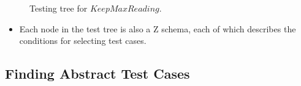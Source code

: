 \begin{figure}

\caption{\label{cstt}Testing tree for $KeepMaxReading$.}
\end{figure}

\begin{itemize}

\item Each node in the test tree is also a Z schema, each of which describes the conditions for selecting test cases.
\end{itemize}

\begin{multicols}{2}

\end{multicols}

\subsection{\label{fatc}Finding Abstract Test Cases}

